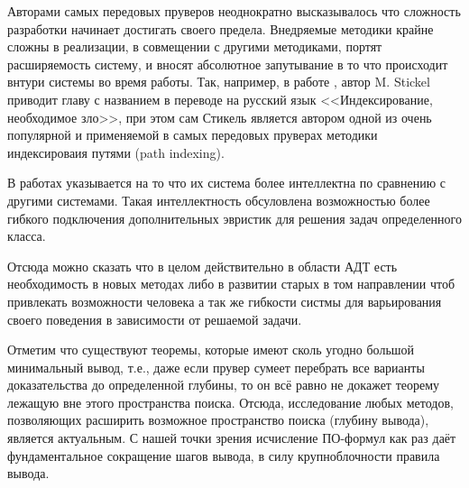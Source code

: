 

Авторами самых передовых пруверов неоднократно высказывалось что сложность разработки начинает достигать своего предела. Внедряемые методики крайне сложны в реализации, в совмещении с другими методиками, портят расширяемость систему, и вносят абсолютное запутывание в то что происходит внтури системы во время работы. Так, например, в работе \cite{BTPstickel}, автор M. Stickel приводит главу с названием в переводе на русский язык <<Индексирование, необходимое зло>>, при этом сам Стикель является автором одной из очень популярной и применяемой в самых передовых пруверах методики индексироваия путями (path indexing).

В работах \cite{Eprover} указывается на то что их система более интеллектна по сравнению с другими системами. Такая интеллектность обсуловлена возможностью более гибкого подключения дополнительных эвристик для решения задач определенного класса. 

Отсюда можно сказать что в целом действительно в области АДТ есть необходимость в новых методах либо в развитии старых в том направлении чтоб привлекать возможности человека а так же гибкости систмы для варьирования своего поведения в зависимости от решаемой задачи.

Отметим что существуют теоремы, которые имеют сколь угодно большой минимальный вывод, т.е., даже если прувер сумеет перебрать все варианты доказательства до определенной глубины, то он всё равно не докажет теорему лежащую вне этого пространства поиска. Отсюда, исследование любых методов, позволяющих расширить возможное пространство поиска (глубину вывода), является актуальным. С нашей точки зрения исчисление ПО-формул как раз даёт фундаментальное сокращение шагов вывода, в силу крупноблочности правила вывода.

